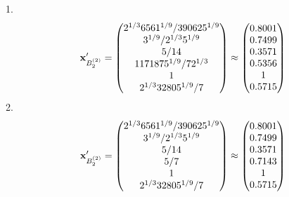 \documentclass[10pt,a4paper]{article}
\begin{document}
	1.
	\[
		\bold{x}'_{B_2^{(2)}} = 
		\begin{pmatrix}
			{{2^ {1 / 3}}{6561^ {1 / 9}}} / {{390625^ {1 / 9}}} \\
			{{3^ {1 / 9}}} / {{2^ {1 / 3}}{5^ {1 / 9}}} \\
			{{5}} / {{14}} \\
			{{1171875^ {1 / 9}}} / {{7}{2^ {1 / 3}}} \\
			{1}{} \\
			{{2^ {1 / 3}}{32805^ {1 / 9}}} / {{7}} \\
		\end{pmatrix}
		\approx
		\begin{pmatrix}
			0.8001   \\
			0.7499   \\
			0.3571   \\
			0.5356   \\
			1        \\
			0.5715   \\
		\end{pmatrix}
	\]
	2.
	\[
		\bold{x}'_{B_2^{(2)}} = 
		\begin{pmatrix}
			{{2^ {1 / 3}}{6561^ {1 / 9}}} / {{390625^ {1 / 9}}} \\
			{{3^ {1 / 9}}} / {{2^ {1 / 3}}{5^ {1 / 9}}} \\
			{{5}} / {{14}} \\
			{{5}} / {{7}} \\
			{1}{} \\
			{{2^ {1 / 3}}{32805^ {1 / 9}}} / {{7}} \\
		\end{pmatrix}
		\approx
		\begin{pmatrix}
			0.8001   \\
			0.7499   \\
			0.3571   \\
			0.7143   \\
			1        \\
			0.5715   \\
		\end{pmatrix}
	\]
\end{document}
